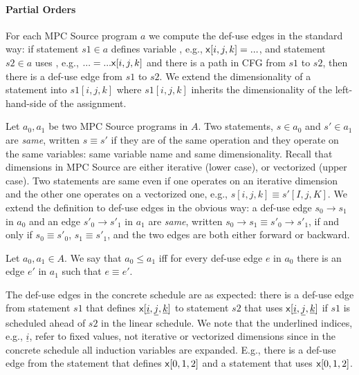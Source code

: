 \squeeze
\paragraph{Partial Orders}

For each MPC Source program $a$ we compute the def-use edges in the standard way: if statement $s1 \in a$ defines variable \x, e.g., ${\sf {x}}[i,j,k] = ...$, 
and statement $s2 \in a$ uses \x, e.g., $... = ... {\sf {x}}[i,j,k]$ and there is a path in CFG from $s1$ to $s2$, then there is a def-use edge from
 $s1$ to $s2$. We extend the dimensionality of a statement into $s1[i,j,k]$ where $s1[i,j,k]$ inherits the dimensionality of the left-hand-side of the assignment.
    
 Let $a_0, a_1$ be two MPC Source programs in $A$. 
 Two statements, $s \in a_0$ and $s' \in a_1$ are \emph{same}, written $s \equiv s'$ if they are of the same operation and they operate on 
 the same variables: same variable name and same dimensionality. Recall that dimensions in MPC Source are either iterative (lower case), or vectorized (upper case). 
 Two statements are same even if one operates on an iterative dimension and the other one operates on a vectorized one, e.g., $s[i,j,k] \equiv s'[I,j,K]$.
 We extend the definition to def-use edges in the obvious way: a def-use edge $s_0 \rightarrow s_1$ in $a_0$ and an edge $s'_0 \rightarrow s'_1$ in $a_1$
 are \emph{same}, written $s_0 \rightarrow s_1 \equiv s'_0 \rightarrow s'_1$, if and only if $s_0 \equiv s'_0$, $s_1 \equiv s'_1$, and the two edges are both either 
 forward or backward. 
  
\begin{definition} Let $a_0, a_1 \in A$. We say that $a_0 \le a_1$ iff for every def-use edge $e$ in $a_0$ there is an edge
$e'$ in $a_1$ such that $e \equiv e'$.
\end{definition}
 
 The def-use edges in the concrete schedule are as expected: there is a def-use edge from statement $s1$ that defines ${\sf {x}}[\underline{i},\underline{j},\underline{k}]$
 to statement $s2$ that uses ${\sf {x}}[\underline{i},\underline{j},\underline{k}]$ if $s1$ is scheduled ahead of $s2$ in the linear schedule. We note that the underlined
 indices, e.g., $\underline{i}$, refer to fixed values, not iterative or vectorized dimensions since in the concrete schedule all induction variables are expanded. 
 E.g., there is a def-use edge from the statement that defines ${\sf {x}}[0,1,2]$ and a statement that uses ${\sf {x}}[0,1,2]$.
 
\squeeze 
